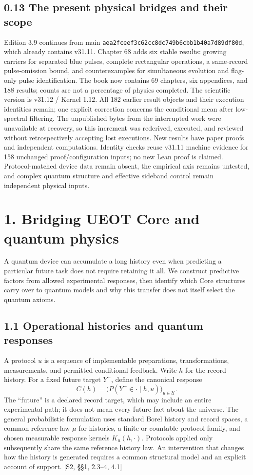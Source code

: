 \documentclass[
  11pt,
  oneside]{book}
\begin{document}
\section{0.13 The present physical bridges and their scope}

Edition 3.9 continues from main
\texttt{aea2fceef3c6\allowbreak 2cc8dc749b6c\allowbreak bb1b40a7d89d\allowbreak f80d}, which already
contains v31.11. Chapter 68 adds six stable results: growing carriers
for separated blue pulses, complete rectangular operations, a
same-record pulse-omission bound, and counterexamples for simultaneous
evolution and flag-only pulse identification. The book now contains 69
chapters, six appendices, and 188 results; counts are not a percentage
of physics completed. The scientific version is v31.12 / Kernel 1.12.
All 182 earlier result objects and their execution identities remain;
one explicit correction concerns the conditional mean after low-spectral
filtering. The unpublished bytes from the interrupted work were
unavailable at recovery, so this increment was rederived, executed, and
reviewed without retrospectively accepting lost executions. New results
have paper proofs and independent computations. Identity checks reuse
v31.11 machine evidence for 158 unchanged proof/configuration inputs; no
new Lean proof is claimed. Protocol-matched device data remain absent,
the empirical axis remains untested, and complex quantum structure and
effective sideband control remain independent physical inputs.

\chapter{1. Bridging UEOT Core and quantum physics}\label{ch-1}

A quantum device can accumulate a long history even when predicting a
particular future task does not require retaining it all. We construct
predictive factors from allowed experimental responses, then identify
which Core structures carry over to quantum models and why this transfer
does not itself select the quantum axioms.

\section{1.1 Operational histories and quantum responses}

A protocol \(u\) is a sequence of implementable preparations,
transformations, measurements, and permitted conditional feedback. Write
\(h\) for the record history. For a fixed future target \(Y^+\), define
the canonical response \[
C(h)=\bigl(P(Y^+\in\cdot\mid h,u)\bigr)_{u\in\mathcal U}.
\] The ``future'' is a declared record target, which may include an
entire experimental path; it does not mean every future fact about the
universe. The general probabilistic formulation uses standard Borel
history and record spaces, a common reference law \(\mu\) for histories,
a finite or countable protocol family, and chosen measurable response
kernels \(K_u(h,\cdot)\). Protocols applied only subsequently share the
same reference history law. An intervention that changes how the history
is generated requires a common structural model and an explicit account
of support. {[}S2, §§1, 2.3--4, 4.1{]}
\end{document}
